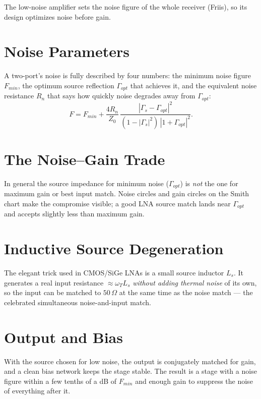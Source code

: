 The low-noise amplifier sets the noise figure of the whole receiver (Friis), so
its design optimizes noise before gain.

\section{Noise Parameters}
A two-port's noise is fully described by four numbers: the minimum noise figure
$F_{min}$, the optimum source reflection $\Gamma_{opt}$ that achieves it, and the
equivalent noise resistance $R_n$ that says how quickly noise degrades away from
$\Gamma_{opt}$:
\[ F = F_{min} + \frac{4 R_n}{Z_0}\,\frac{|\Gamma_s - \Gamma_{opt}|^2}
       {(1-|\Gamma_s|^2)\,|1+\Gamma_{opt}|^2}. \]

\section{The Noise--Gain Trade}
In general the source impedance for minimum noise ($\Gamma_{opt}$) is \emph{not}
the one for maximum gain or best input match. Noise circles and gain circles on
the Smith chart make the compromise visible; a good LNA source match lands near
$\Gamma_{opt}$ and accepts slightly less than maximum gain.

\section{Inductive Source Degeneration}
The elegant trick used in CMOS/SiGe LNAs is a small source inductor $L_s$. It
generates a real input resistance $\approx \omega_T L_s$ \emph{without adding
thermal noise} of its own, so the input can be matched to $50\,\Omega$ at the same
time as the noise match --- the celebrated simultaneous noise-and-input match.

\section{Output and Bias}
With the source chosen for low noise, the output is conjugately matched for gain,
and a clean bias network keeps the stage stable. The result is a stage with a
noise figure within a few tenths of a dB of $F_{min}$ and enough gain to suppress
the noise of everything after it.
